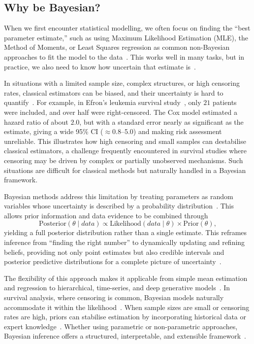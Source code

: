 \subsection{Why be Bayesian?}\label{Why Bayesian}
When we first encounter statistical modelling, we often focus on finding the “best parameter estimate,” such as using Maximum Likelihood Estimation (MLE), the Method of Moments, or Least Squares regression as common non-Bayesian approaches to fit the model to the data~\cite{van2021bayesian}. This works well in many tasks, but in practice, we also need to know how uncertain that estimate is~\cite{gelman1995bayesian}. 

In situations with a limited sample size, complex structures, or high censoring rates, classical estimators can be biased, and their uncertainty is hard to quantify~\cite{van2021bayesian, ibrahim2013bayesian}. For example, in Efron’s leukemia survival study~\cite{Efron01091977}, only $21$ patients were included, and over half were right-censored. The Cox model estimated a hazard ratio of about $2.0$, but with a standard error nearly as significant as the estimate, giving a wide 95\% CI ($\approx$0.8–5.0) and making risk assessment unreliable. This illustrates how high censoring and small samples can destabilise classical estimators, a challenge frequently encountered in survival studies where censoring may be driven by complex or partially unobserved mechanisms. Such situations are difficult for classical methods but naturally handled in a Bayesian framework.

Bayesian methods address this limitation by treating parameters as random variables whose uncertainty is described by a probability distribution~\cite{gelman1995bayesian}. This allows prior information and data evidence to be combined through
$$
\text{Posterior}(\theta \mid data)
\propto
\text{Likelihood}(data \mid \theta)
\times
\text{Prior}(\theta),
$$
yielding a full posterior distribution rather than a single estimate. This reframes inference from “finding the right number” to dynamically updating and refining beliefs, providing not only point estimates but also credible intervals and posterior predictive distributions for a complete picture of uncertainty~\cite{gelman1995bayesian}.

The flexibility of this approach makes it applicable from simple mean estimation and regression to hierarchical, time-series, and deep generative models~\cite{carlin1997bayes}. In survival analysis, where censoring is common, Bayesian models naturally accommodate it within the likelihood~\cite{bartovs2022informed}. When sample sizes are small or censoring rates are high, priors can stabilise estimation by incorporating historical data or expert knowledge~\cite{gelman1995bayesian}. Whether using parametric or non-parametric approaches, Bayesian inference offers a structured, interpretable, and extensible framework~\cite{van2021bayesian}. 

